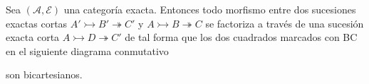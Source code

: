 \documentclass[tesis]{subfiles}
\begin{document}
\begin{Prop}\label{Bühler-3.1}
    Sea $(\mathscr{A},\mathscr{E})$ una categoría exacta. Entonces todo morfismo entre dos sucesiones exactas cortas $A'\rightarrowtail B'\twoheadrightarrow C'$ y $A\rightarrowtail B\twoheadrightarrow C$ se factoriza a través de una sucesión exacta corta $A\rightarrowtail D\twoheadrightarrow C'$ de tal forma que los dos cuadrados marcados con BC en el siguiente diagrama conmutativo
    \begin{center}
    \end{center}
    son bicartesianos. %
\end{Prop}
\end{document}

